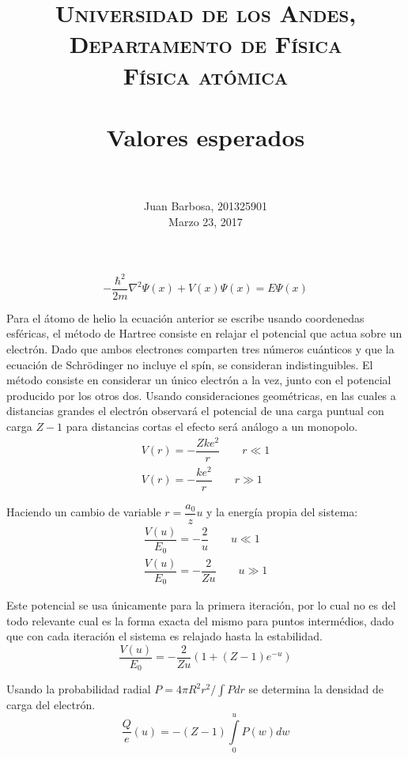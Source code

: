 \documentclass[paper=letter, fontsize=11pt]{scrartcl}
\title{
        \usefont{OT1}{bch}{b}{n}
        \normalfont \normalsize \textsc{Universidad de los Andes, Departamento de F\'isica \\
        F\'isica at\'omica} \\ [25pt]
        \horrule{0.5pt} \\[0.4cm]
        \huge Valores esperados \\
        \horrule{2pt} \\[0.5cm]
}
\author{
        \normalfont                                 \normalsize
        Juan Barbosa, 201325901\\[-3pt]      \normalsize
        Marzo 23, 2017
}
\date{}
\begin{document}
\maketitle

\[
\boxed{-\dfrac{\hbar^2}{2m}\nabla^2\Psi(x) + V(x)\Psi(x) = E\Psi(x)}
\]

Para el \'atomo de helio la ecuaci\'on anterior se escribe usando coordenedas esf\'ericas, el m\'etodo de Hartree consiste en relajar el potencial que actua sobre un electr\'on. Dado que ambos electrones comparten tres n\'umeros cu\'anticos y que la ecuaci\'on de Schr\"odinger no incluye el sp\'in, se consideran indistinguibles. El m\'etodo consiste en considerar un \'unico electr\'on a la vez, junto con el potencial producido por los otros dos. Usando consideraciones geom\'etricas, en las cuales a distancias grandes el electr\'on observar\'a el potencial de una carga puntual con carga $Z-1$ para distancias cortas el efecto ser\'a an\'alogo a un monopolo. 
\begin{equation}
	\begin{matrix}
		V(r) = -\dfrac{Zke^2}{r} \qquad r \ll 1 \\
		V(r) = -\dfrac{ke^2}{r} \qquad r \gg 1
	\end{matrix}
\end{equation}

Haciendo un cambio de variable $r=\dfrac{a_0}{z}u$ y la energ\'ia propia del sistema:
\begin{equation}
	\begin{matrix}
		\dfrac{V(u)}{E_0} = -\dfrac{2}{u} \qquad u \ll 1 \\
		\dfrac{V(u)}{E_0} = -\dfrac{2}{Zu} \qquad u \gg 1
	\end{matrix}
\end{equation}

Este potencial se usa \'unicamente para la primera iteraci\'on, por lo cual no es del todo relevante cual es la forma exacta del mismo para puntos interm\'edios, dado que con cada iteraci\'on el sistema es relajado hasta la estabilidad.
\begin{equation}
	\dfrac{V(u)}{E_0} = -\dfrac{2}{Zu}\left(1+(Z-1)e^{-u}\right)
\end{equation}

Usando la probabilidad radial $P=4\pi R^2r^2/\int Pdr$ se determina la densidad de carga del electr\'on.
\begin{equation}
	\dfrac{Q}{e}(u) = -(Z-1)\int\limits_{0}^{u}P(w)dw
\end{equation}
\end{document}
